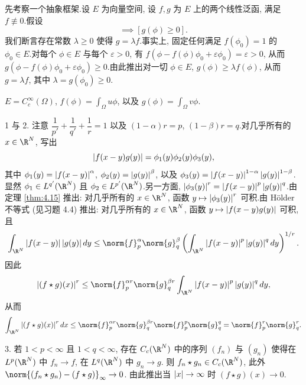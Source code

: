 先考察一个抽象框架.设 $E$ 为向量空间, 设 $f,g$ 为 $E$ 上的两个线性泛函,
满足 $f\not\equiv0$.假设
\begin{equation*}
[\phi\in E\ \text{且}\ f(\phi)>0]\implies[g(\phi)\ge0].
\end{equation*}
我们断言存在常数 $\lambda\ge0$ 使得 $g=\lambda f$.事实上, 固定任何满足
$f(\phi_0)=1$ 的 $\phi_0\in E$.对每个 $\phi\in E$ 与每个 $\varepsilon>0$,
有 $f(\phi-f(\phi)\phi_0+\varepsilon\phi_0)=\varepsilon>0$, 从而
$g(\phi-f(\phi)\phi_0+\varepsilon\phi_0)\ge0$.由此推出对一切 $\phi\in E$,
$g(\phi)\ge\lambda f(\phi)$, 从而 $g=\lambda f$, 其中 $\lambda=g(\phi_0)\ge0$.

 $E=C_c^\infty(\Omega)$, $f(\phi)=\int_\Omega u\phi$, 以及
$g(\phi)=\int_\Omega v\phi$.


1 与 2. 注意 $\dfrac{1}{p'}+\dfrac{1}{q'}+\dfrac1r=1$ 以及 $(1-\alpha)r=p$,
$(1-\beta)r=q$.对几乎所有的 $x\in\R^N$, 写出
\begin{equation*}
\left|f(x-y)g(y)\right|=\phi_1(y)\phi_2(y)\phi_3(y),
\end{equation*}
其中 $\phi_1(y)=\left|f(x-y)\right|^\alpha$, $\phi_2(y)=\left|g(y)\right|^\beta$, 以及
$\phi_3(y)=\left|f(x-y)\right|^{1-\alpha}\left|g(y)\right|^{1-\beta}$.显然
$\phi_1\in L^{q'}(\R^N)$ 且 $\phi_2\in L^{p'}(\R^N)$.另一方面,
$\left|\phi_3(y)\right|^r=\left|f(x-y)\right|^p\left|g(y)\right|^q$.由定理  \ref{thm:4.15} 推出:
对几乎所有的 $x\in\R^N$, 函数 $y\mapsto\left|\phi_3(y)\right|^r$ 可积.由 Hölder
不等式 (见习题 4.4) 推出: 对几乎所有的 $x\in\R^N$, 函数 $y\mapsto\left|f(x-y)g(y)\right|$
可积, 且
\begin{equation*}
\int_{\R^N}\abs{f(x-y)}\abs{g(y)}dy\le\norm{f}_p^\alpha\norm{g}_q^\beta
\left(\int_{\R^N}\abs{f(x-y)}^p\abs{g(y)}^qdy\right)^{1/r}.
\end{equation*}
因此
\begin{equation*}
\abs{(f\star g)(x)}^r\le\norm{f}_p^{\alpha r}\norm{g}_q^{\beta r}
\int_{\R^N}\abs{f(x-y)}^p\abs{g(y)}^qdy,
\end{equation*}
从而
\begin{equation*}
\int_{\R^N}\abs{(f\star g)(x)}^rdx\le\norm{f}_p^{\alpha r}\norm{g}_q^{\beta r}
\norm{f}_p^p\norm{g}_q^q=\norm{f}_p^r\norm{g}_q^r.
\end{equation*}

3. 若 $1<p<\infty$ 且 $1<q<\infty$, 存在 $C_c(\R^N)$ 中的序列 $(f_n)$ 与
$(g_n)$ 使得在 $L^p(\R^N)$ 中 $f_n\to f$, 在 $L^q(\R^N)$ 中 $g_n\to g$.
则 $f_n\star g_n\in C_c(\R^N)$, 此外 $\norm{(f_n\star g_n)-(f\star g)}_\infty\to0$.
由此推出当 $\left|x\right|\to\infty$ 时 $(f\star g)(x)\to0$.

